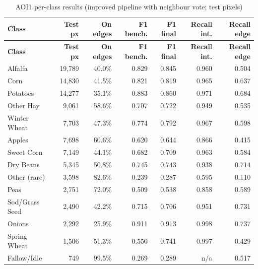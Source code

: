 \endgroup

\begingroup\small
\begin{longtable}{L{3.2cm} r r r r r r}
\caption{AOI1 per-class results (improved pipeline with neighbour vote; test pixels)}\label{tab:perclass}\\
\toprule
\textbf{Class} & \textbf{Test px} & \textbf{On edges} & \textbf{F1 bench.} & \textbf{F1 final} & \textbf{Recall int.} & \textbf{Recall edge}\\
\midrule\endfirsthead
\toprule
\textbf{Class} & \textbf{Test px} & \textbf{On edges} & \textbf{F1 bench.} & \textbf{F1 final} & \textbf{Recall int.} & \textbf{Recall edge}\\
\midrule\endhead
\bottomrule\endlastfoot
Alfalfa & 19,789 & 40.0\% & 0.829 & 0.845 & 0.960 & 0.504\\
Corn & 14,830 & 41.5\% & 0.821 & 0.819 & 0.965 & 0.637\\
Potatoes & 14,277 & 35.1\% & 0.883 & 0.860 & 0.971 & 0.684\\
Other Hay & 9,061 & 58.6\% & 0.707 & 0.722 & 0.949 & 0.535\\
Winter Wheat & 7,703 & 47.3\% & 0.774 & 0.792 & 0.967 & 0.598\\
Apples & 7,698 & 60.6\% & 0.620 & 0.644 & 0.866 & 0.415\\
Sweet Corn & 7,149 & 44.1\% & 0.682 & 0.709 & 0.963 & 0.584\\
Dry Beans & 5,345 & 50.8\% & 0.745 & 0.743 & 0.938 & 0.714\\
Other (rare) & 3,598 & 82.6\% & 0.239 & 0.287 & 0.595 & 0.110\\
Peas & 2,751 & 72.0\% & 0.509 & 0.538 & 0.858 & 0.589\\
Sod/Grass Seed & 2,490 & 42.2\% & 0.715 & 0.706 & 0.951 & 0.731\\
Onions & 2,292 & 25.9\% & 0.911 & 0.913 & 0.998 & 0.737\\
Spring Wheat & 1,506 & 51.3\% & 0.550 & 0.741 & 0.997 & 0.429\\
Fallow/Idle & 749 & 99.5\% & 0.269 & 0.289 & n/a & 0.517\\
\end{longtable}
\endgroup

